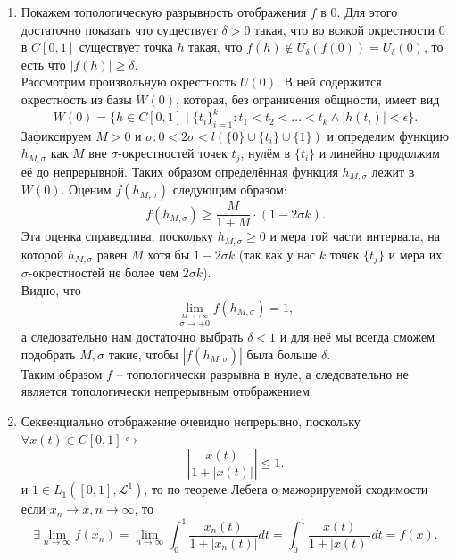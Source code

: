 \begin{solve}
    \begin{enumerate}
        \item Покажем топологическую разрывность отображения $f$ в 0. Для этого достаточно показать что существует $\delta > 0$ такая, что во всякой окрестности $0$ в $C[0, 1]$ существует точка $h$ такая, что $f(h) \notin U_\delta(f(0)) = U_\delta(0)$, то есть что $|f(h)| \geq \delta$. \\
        Рассмотрим произвольную окрестность $U(0)$. В ней содержится окрестность из базы $W(0)$, которая, без ограничения общности, имеет вид
        \[
            W(0) = \{h \in C[0, 1] \mid \{t_i\}_{i = 1}^k \colon t_1 < t_2 < \ldots < t_k \wedge |h(t_i)| < \epsilon\}.
        \]
        Зафиксируем $M > 0$ и $\sigma\colon 0 < 2\sigma < l(\{0\} \cup \{t_i\} \cup \{1\})$ и определим функцию $h_{M, \sigma}$ как $M$ вне $\sigma$-окрестностей точек $t_j$, нулём в $\{t_i\}$ и линейно продолжим её до непрерывной. Таких образом определённая функция $h_{M, \sigma}$ лежит в $W(0)$. Оценим $f(h_{M, \sigma})$ следующим образом:
        \[
            f(h_{M, \sigma}) \geq \dfrac{M}{1 + M} \cdot (1 - 2\sigma k).
        \]
        Эта оценка справедлива, поскольку $h_{M, \sigma} \geq 0$ и мера той части интервала, на которой $h_{M, \sigma}$ равен $M$ хотя бы $1 - 2 \sigma k$ (так как у нас $k$ точек $\{t_j\}$ и мера их $\sigma$-окрестностей не более чем $2\sigma k$). \\
        Видно, что
        \[
            \lim\limits_{\overset{M \rightarrow +\infty}{\sigma \rightarrow +0}} f(h_{M, \sigma}) = 1,
        \]
        а следовательно нам достаточно выбрать $\delta < 1$ и для неё мы всегда сможем подобрать $M, \sigma$ такие, чтобы $|f(h_{M, \sigma})|$ была больше $\delta$. \\
        Таким образом $f$ -- топологически разрывна в нуле, а следовательно не является топологически непрерывным отображением.
        \item Секвенциально отображение очевидно непрерывно, поскольку $\forall x(t) \in C[0, 1]\hookrightarrow$
        \[
            \left|\dfrac{x(t)}{1 + |x(t)|}\right| \leq 1.
        \]
        и $1 \in L_1([0, 1], \mathcal{L}^1)$, то по теореме Лебега о мажорируемой сходимости если $x_n \rightarrow x, n \rightarrow \infty$, то
        \[
            \exists \lim\limits_{n \rightarrow \infty} f(x_n) =  \lim\limits_{n \rightarrow \infty} \int_0^1 \dfrac{x_n(t)}{1 +|x_n(t)|}dt = \int_0^1
            \dfrac{x(t)}{1 + |x(t)|}dt = f(x).
        \]
    \end{enumerate}
\end{solve}
